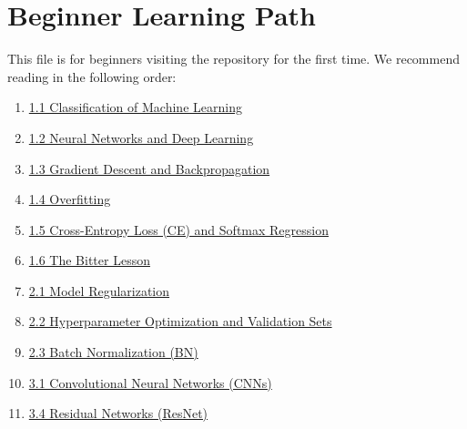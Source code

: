 \hypertarget{beginner-learning-path}{%
\chapter{Beginner Learning Path}\label{beginner-learning-path}}

This file is for beginners visiting the repository for the first time. We recommend reading in the following order:

\begin{enumerate}
\def\labelenumi{\arabic{enumi}.}
\tightlist
\item
  \href{docs-en/01-deep-learning/01-fundamentals-of-deep-learning/01-01-classification-of-machine-learning.md}{1.1 Classification of Machine Learning}
\item
  \href{docs-en/01-deep-learning/01-fundamentals-of-deep-learning/01-02-neural-networks-and-deep-learning.md}{1.2 Neural Networks and Deep Learning}
\item
  \href{docs-en/01-deep-learning/01-fundamentals-of-deep-learning/01-03-gradient-descent-and-backpropagation.md}{1.3 Gradient Descent and Backpropagation}
\item
  \href{docs-en/01-deep-learning/01-fundamentals-of-deep-learning/01-04-overfitting.md}{1.4 Overfitting}
\item
  \href{docs-en/01-deep-learning/01-fundamentals-of-deep-learning/01-05-cross-entropy-loss-and-softmax-regression.md}{1.5 Cross-Entropy Loss (CE) and Softmax Regression}
\item
  \href{docs-en/01-deep-learning/01-fundamentals-of-deep-learning/01-06-the-bitter-lesson.md}{1.6 The Bitter Lesson}
\item
  \href{docs-en/01-deep-learning/02-common-methods-for-neural-network-training/02-01-model-regularization.md}{2.1 Model Regularization}
\item
  \href{docs-en/01-deep-learning/02-common-methods-for-neural-network-training/02-02-hyperparameter-optimization-and-validation-sets.md}{2.2 Hyperparameter Optimization and Validation Sets}
\item
  \href{docs-en/01-deep-learning/02-common-methods-for-neural-network-training/02-03-batch-normalization.md}{2.3 Batch Normalization (BN)}
\item
  \href{docs-en/01-deep-learning/03-convolutional-neural-networks/03-01-convolutional-neural-networks.md}{3.1 Convolutional Neural Networks (CNNs)}
\item
  \href{docs-en/01-deep-learning/03-convolutional-neural-networks/03-04-residual-networks.md}{3.4 Residual Networks (ResNet)}

\end{enumerate}
